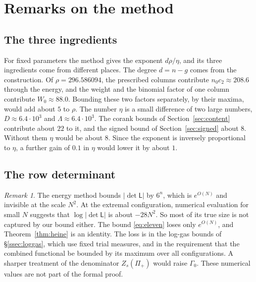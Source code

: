 \documentclass[11pt]{amsart}
\newcommand{\Rho}{296.586094}
\theoremstyle{definition}
\theoremstyle{remark}
\newtheorem{remark}[theorem]{Remark}
\numberwithin{equation}{section}
\begin{document}
\section{Remarks on the method}\label{sec:remarks}

\subsection{The three ingredients}
For fixed parameters the method gives the exponent $d\rho/\eta$, and its three ingredients come from
different places. The degree $d=n-g$ comes from the construction. Of $\rho=\Rho$, the prescribed columns
contribute $n_0c_2\approx208.6$ through the energy, and the weight and the binomial factor of one column
contribute $W_0\approx88.0$. Bounding these two factors separately, by their maxima, would add about $5$ to
$\rho$. The number $\eta$ is a small difference of two large numbers, $D\approx6.4\cdot10^3$ and
$\Lambda\approx6.4\cdot10^3$. The corank bounds of Section~\ref{sec:content} contribute about $22$ to it, and the
signed bound of Section~\ref{sec:signed} about $8$. Without them $\eta$ would be about $8$. Since the exponent
is inversely proportional to $\eta$, a further gain of $0.1$ in $\eta$ would lower it by about $1$.

\subsection{The row determinant}
\begin{remark}\label{rem:L}
The energy method bounds $|\det\mathsf L|$ by $6^n$, which is $e^{O(N)}$ and invisible at the scale $N^2$.
At the extremal configuration, numerical evaluation for small $N$ suggests that $\log|\det\mathsf L|$ is about
$-28N^2$. So most of its true size is not captured by our bound either. The bound \eqref{eq:eleven} loses only
$e^{O(N)}$, and Theorem~\ref{thm:heine} is an identity. The loss is in the log-gas bounds of
\S\ref{ssec:loggas}, which use fixed trial measures, and in the requirement that the combined functional be
bounded by its maximum over all configurations. A sharper treatment of the denominator $Z_s(\Pi_+)$ would
raise $\Gamma_0$. These numerical values are not part of the formal proof.
\end{remark}
\end{document}
